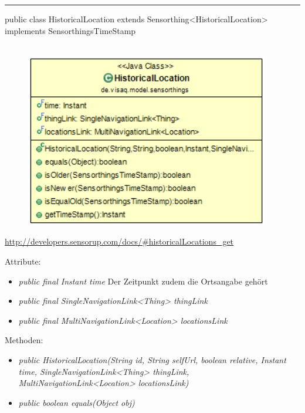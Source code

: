 \rule{\textwidth}{0.4pt}
public class HistoricalLocation extends Sensorthing<HistoricalLocation> implements SensorthingsTimeStamp
\\\\
\begin{minipage}{0.4\textwidth}
    \begin{figure}[H]
        {\centering\includegraphics[width=0.95\textwidth]{media/backend/modell/classes/HistoricalLocation.png}}
    \end{figure}
    \end{minipage} \hfill
\begin{minipage}{0.6\textwidth}
    \url{http://developers.sensorup.com/docs/#historicalLocations_get}
\end{minipage}

Attribute:
\begin{itemize}
    \item \emph{public final Instant time} Der Zeitpunkt zudem die Ortsangabe gehört
    \item \emph{public final SingleNavigationLink<Thing> thingLink} 
    \item \emph{public final MultiNavigationLink<Location> locationsLink} 
\end{itemize}
Methoden:
\begin{itemize}
    \item \emph{public HistoricalLocation(String id, String selfUrl, boolean relative, Instant time, SingleNavigationLink<Thing> thingLink, MultiNavigationLink<Location> locationsLink)}
    \item \emph{public boolean equals(Object obj)} 
\end{itemize}

